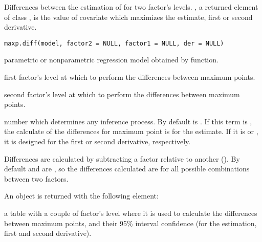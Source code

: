 %
\begin{Description}\relax
Differences between the estimation of  for two  factor's levels. , a returned element  of class , is the value of covariate  which maximizes the  estimate, first or second derivative.
\end{Description}
%
\begin{Usage}
\begin{verbatim}
maxp.diff(model, factor2 = NULL, factor1 = NULL, der = NULL)
\end{verbatim}
\end{Usage}
%
\begin{Arguments}
\begin{ldescription}
\item[\code{model}] parametric or nonparametric regression model obtained by  function.

\item[\code{factor1}] first factor's level at which to perform the differences between maximum points.

\item[\code{factor2}] second factor's level at which to perform the differences between maximum points.

\item[\code{der}] number which determines any inference process. By default  is . If this term is , the calculate of the differences for maximum point is for the estimate. If it is  or , it is designed for the first or second derivative, respectively.

\end{ldescription}
\end{Arguments}
%
\begin{Details}\relax
Differences are calculated by subtracting a factor relative to another ().  By default  and  are , so the differences calculated are for all possible combinations between two factors.
\end{Details}
%
\begin{Value}
An object is returned with the following element:
\begin{ldescription}
\item[\code{maxp.diff}] a table with a couple of factor's level where it is used to calculate the differences between maximum points, and their 95\% interval confidence (for the estimation, first and second derivative).
\end{ldescription}
\end{Value}
